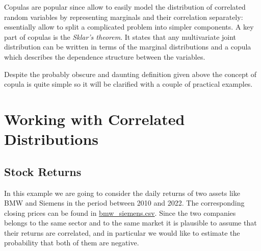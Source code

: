 Copulas are popular since allow to easily model the distribution of correlated random variables by representing marginals and their correlation separately: essentially allow to split a complicated problem into simpler components.
A key part of copulas is the \emph{Sklar’s theorem}. It states that any multivariate joint distribution can be written in terms of the marginal distributions and a copula which describes the dependence structure between the variables. 



Despite the probably obscure and daunting definition given above the concept of copula is quite simple so it will be clarified with a couple of practical examples.

\section{Working with Correlated Distributions}
\label{sec:generate-correlated-distributions}

\subsection{Stock Returns}
\label{sec:correlated_stock_returns}

In this example we are going to consider the daily returns of two assets like BMW and Siemens in the period between 2010 and 2022. 
The corresponding closing prices can be found in \href{https://github.com/matteosan1/finance_course/raw/master/input_files/bmw_siemens.csv}{bmw\_siemens.csv}.
Since the two companies belongs to the same sector and to the same market it is plausible to assume that their returns are correlated, and in particular we would like to estimate the probability that both of them are negative.

